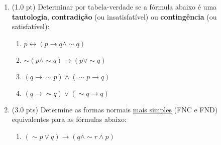 \documentclass[12pt]{article}
\begin{document}
\begin{enumerate}

\begin{comment}
\item (1.0 pt) Determina o valor lógico das fórmulas abaixo:

\begin{itemize}
\setlength{\itemsep}{-3pt}
\item $-2 < 0 \leftrightarrow \pi^2 < 0 \wedge $ Roma é a capital da Itália
\item $3+4=7 \vee 13 $ é um número primo $\rightarrow \sqrt 16 > 2$
\item $3^2 + 4^2 = 5^2  ~\wedge $ Tóquio não fica no Japão $\rightarrow ( \pi > 2.04 \leftrightarrow 2 \neq 3 )$
\item Na Espanha se fala português $\wedge~ 2^3 - 4 > 5^2 - 10 \vee 5 \neq 3+3$
\end{itemize}
\end{comment}

\item (1.0 pt) Determinar por tabela-verdade se a fórmula abaixo é uma {\bf tautologia}, {\bf contradição} (ou insatisfatível) ou {\bf contingência} (ou satisfatível): 

\begin{enumerate}
\setlength{\itemsep}{-2pt}


\item $p \leftrightarrow (p \rightarrow q \wedge \sim q)$




\item $\sim (p \wedge \sim q) \rightarrow  (p \vee \sim q)$


\item $ (q \rightarrow \sim p) \wedge (\sim p \rightarrow  q) $ 

\item $ (q \rightarrow \sim q) \vee (\sim q \rightarrow  q) $
\end{enumerate}


\item (3.0 pts) Determine as formas normais \underline{mais simples} (FNC e FND) equivalentes para as fórmulas abaixo: 
\begin{enumerate}
\setlength{\itemsep}{-2pt}

\item $(\sim p \vee q)  \rightarrow  (q \wedge \sim r \wedge p) $


\end{enumerate}
\end{enumerate}
\end{document}
